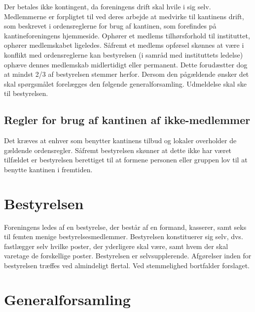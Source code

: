\documentclass[a4paper, 10pt]{article}
\begin{document}
Der betales ikke kontingent, da foreningens drift skal hvile i sig
selv. Med\-lemmerne er forpligtet til ved deres arbejde at medvirke
til kantinens drift, som beskrevet i ordensreglerne for brug af
kantinen, som forefindes på kantineforeningens hjemmeside.  Ophører et
medlems tilhørsforhold til instituttet, ophører medlemskabet
ligeledes.  Såfremt et medlems opførsel skønnes at være i konflikt med
ordensreglerne kan bestyrelsen (i samråd med instituttets le\-delse)
ophæve dennes medlemskab midlertidigt eller permanent. Dette
forudæstter dog at mindst 2/3 af bestyrelsen stemmer herfor. Dersom
den pågældende ønsker det skal spørgsmålet forelægges den følgende
generalforsamling. Udmeldelse skal ske til bestyrelsen.

\subsection{Regler for brug af kantinen af ikke-medlemmer}

Det kræves at enhver som benytter kantinens tilbud og lokaler
overholder de gældende ordensregler. Såfremt bestyrelsen skønner at
dette ikke har været tilfældet er bestyrelsen berettiget til at
formene personen eller gruppen lov til at benytte kantinen i
fremtiden.

\section{Bestyrelsen}

Foreningens ledes af en bestyrelse, der består af en formand,
kasserer, samt seks til femten menige bestyrelsesmedlemmer.
Bestyrelsen konstituerer sig selv, dvs. fastlægger selv hvilke poster,
der yderligere skal være, samt hvem der skal varetage de forskellige
poster. Bestyre\-lsen er selvsupplerende. Afgøre\-lser inden for
bestyrelsen træffes ved almindeligt flertal. Ved stemmelighed
bortfalder forslaget.

\section{Generalforsamling}
\end{document}
